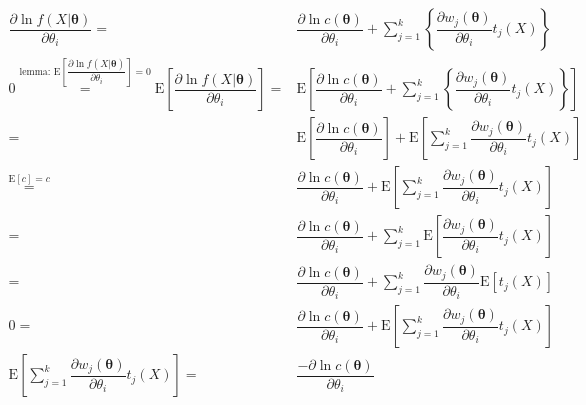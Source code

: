 \documentclass[
]{book}
\theoremstyle{definition}
\theoremstyle{definition}
\theoremstyle{definition}
\theoremstyle{definition}
\theoremstyle{remark}
\begin{document}
\[
\begin{aligned}
\dfrac{\partial\ln f\left(X|\boldsymbol{\theta}\right)}{\partial\theta_{{\scriptscriptstyle i}}}= & \dfrac{\partial\ln c\left(\boldsymbol{\theta}\right)}{\partial\theta_{{\scriptscriptstyle i}}}+\sum\limits _{j=1}^{k}\left\{ \dfrac{\partial w_{{\scriptscriptstyle j}}\left(\boldsymbol{\theta}\right)}{\partial\theta_{{\scriptscriptstyle i}}}t_{{\scriptscriptstyle j}}\left(X\right)\right\} \\
0\overset{\text{lemma: }\mathrm{E}\left[\dfrac{\partial\ln f\left(X|\boldsymbol{\theta}\right)}{\partial\theta_{{\scriptscriptstyle i}}}\right]=0}{=}\mathrm{E}\left[\dfrac{\partial\ln f\left(X|\boldsymbol{\theta}\right)}{\partial\theta_{{\scriptscriptstyle i}}}\right]= & \mathrm{E}\left[\dfrac{\partial\ln c\left(\boldsymbol{\theta}\right)}{\partial\theta_{{\scriptscriptstyle i}}}+\sum\limits _{j=1}^{k}\left\{ \dfrac{\partial w_{{\scriptscriptstyle j}}\left(\boldsymbol{\theta}\right)}{\partial\theta_{{\scriptscriptstyle i}}}t_{{\scriptscriptstyle j}}\left(X\right)\right\} \right]\\
= & \mathrm{E}\left[\dfrac{\partial\ln c\left(\boldsymbol{\theta}\right)}{\partial\theta_{{\scriptscriptstyle i}}}\right]+\mathrm{E}\left[\sum\limits _{j=1}^{k}\dfrac{\partial w_{{\scriptscriptstyle j}}\left(\boldsymbol{\theta}\right)}{\partial\theta_{{\scriptscriptstyle i}}}t_{{\scriptscriptstyle j}}\left(X\right)\right]\\
\overset{\mathrm{E}\left[c\right]=c}{=} & \dfrac{\partial\ln c\left(\boldsymbol{\theta}\right)}{\partial\theta_{{\scriptscriptstyle i}}}+\mathrm{E}\left[\sum\limits _{j=1}^{k}\dfrac{\partial w_{{\scriptscriptstyle j}}\left(\boldsymbol{\theta}\right)}{\partial\theta_{{\scriptscriptstyle i}}}t_{{\scriptscriptstyle j}}\left(X\right)\right]\\
= & \dfrac{\partial\ln c\left(\boldsymbol{\theta}\right)}{\partial\theta_{{\scriptscriptstyle i}}}+\sum\limits _{j=1}^{k}\mathrm{E}\left[\dfrac{\partial w_{{\scriptscriptstyle j}}\left(\boldsymbol{\theta}\right)}{\partial\theta_{{\scriptscriptstyle i}}}t_{{\scriptscriptstyle j}}\left(X\right)\right]\\
= & \dfrac{\partial\ln c\left(\boldsymbol{\theta}\right)}{\partial\theta_{{\scriptscriptstyle i}}}+\sum\limits _{j=1}^{k}\dfrac{\partial w_{{\scriptscriptstyle j}}\left(\boldsymbol{\theta}\right)}{\partial\theta_{{\scriptscriptstyle i}}}\mathrm{E}\left[t_{{\scriptscriptstyle j}}\left(X\right)\right]\\
0= & \dfrac{\partial\ln c\left(\boldsymbol{\theta}\right)}{\partial\theta_{{\scriptscriptstyle i}}}+\mathrm{E}\left[\sum\limits _{j=1}^{k}\dfrac{\partial w_{{\scriptscriptstyle j}}\left(\boldsymbol{\theta}\right)}{\partial\theta_{{\scriptscriptstyle i}}}t_{{\scriptscriptstyle j}}\left(X\right)\right]\\
\mathrm{E}\left[\sum\limits _{j=1}^{k}\dfrac{\partial w_{{\scriptscriptstyle j}}\left(\boldsymbol{\theta}\right)}{\partial\theta_{{\scriptscriptstyle i}}}t_{{\scriptscriptstyle j}}\left(X\right)\right]= & \dfrac{-\partial\ln c\left(\boldsymbol{\theta}\right)}{\partial\theta_{{\scriptscriptstyle i}}}
\end{aligned}
\]
\end{document}
